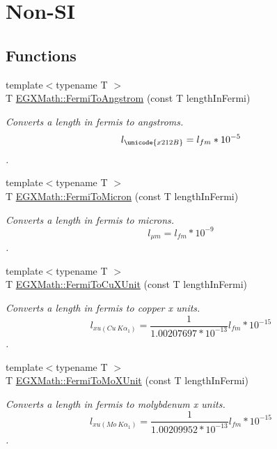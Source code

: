 \hypertarget{group___e_g_x_math-_conversions-_length_conversions-_non-_s_i-_fermi-_non-_s_i}{}\section{Non-\/\+SI}
\label{group___e_g_x_math-_conversions-_length_conversions-_non-_s_i-_fermi-_non-_s_i}
\subsection*{Functions}
\begin{DoxyCompactItemize}
\item 
{\footnotesize template$<$typename T $>$ }\\T \mbox{\hyperlink{group___e_g_x_math-_conversions-_length_conversions-_non-_s_i-_fermi-_non-_s_i_ga9bec1d5936dfd3fa360cf3484685cc23}{E\+G\+X\+Math\+::\+Fermi\+To\+Angstrom}} (const T length\+In\+Fermi)
\begin{DoxyCompactList}\small\item\em Converts a length in fermis to angstroms. \[ l_{\unicode{x212B}}=l_{fm} * 10^{-5} \]. \end{DoxyCompactList}\item 
{\footnotesize template$<$typename T $>$ }\\T \mbox{\hyperlink{group___e_g_x_math-_conversions-_length_conversions-_non-_s_i-_fermi-_non-_s_i_ga8a55f7fbfb5e78f8b22efaeaac18f63b}{E\+G\+X\+Math\+::\+Fermi\+To\+Micron}} (const T length\+In\+Fermi)
\begin{DoxyCompactList}\small\item\em Converts a length in fermis to microns. \[ l_{\mu m}=l_{fm} * 10^{-9} \]. \end{DoxyCompactList}\item 
{\footnotesize template$<$typename T $>$ }\\T \mbox{\hyperlink{group___e_g_x_math-_conversions-_length_conversions-_non-_s_i-_fermi-_non-_s_i_ga8c0963430e8fec7c613543844bd80064}{E\+G\+X\+Math\+::\+Fermi\+To\+Cu\+X\+Unit}} (const T length\+In\+Fermi)
\begin{DoxyCompactList}\small\item\em Converts a length in fermis to copper x units. \[ l_{xu(Cu\ K\alpha_1)}= \frac{1}{1.00207697*10^{-13}} l_{fm} * 10^{-15}\]. \end{DoxyCompactList}\item 
{\footnotesize template$<$typename T $>$ }\\T \mbox{\hyperlink{group___e_g_x_math-_conversions-_length_conversions-_non-_s_i-_fermi-_non-_s_i_ga8555a46e14c4a759e0b04a54485d679e}{E\+G\+X\+Math\+::\+Fermi\+To\+Mo\+X\+Unit}} (const T length\+In\+Fermi)
\begin{DoxyCompactList}\small\item\em Converts a length in fermis to molybdenum x units. \[ l_{xu(Mo\ K\alpha_1)}=\frac{1}{1.00209952*10^{-13}} l_{fm} * 10^{-15}\]. \end{DoxyCompactList}\end{DoxyCompactItemize}


